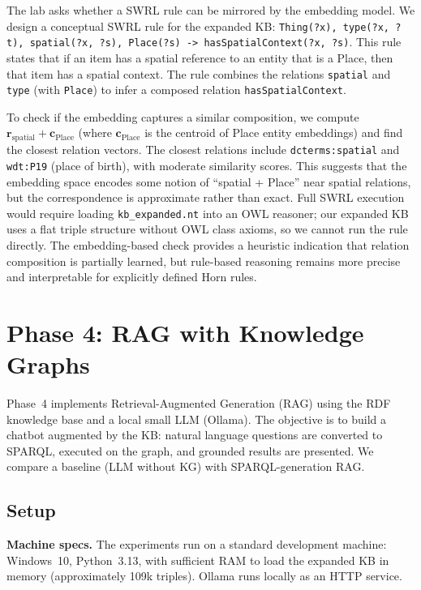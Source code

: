 \documentclass[11pt,a4paper]{article}
\begin{document}
  The lab asks whether a SWRL rule can be mirrored by the embedding model. We design a conceptual SWRL rule for the expanded KB: \texttt{Thing(?x), type(?x, ?t), spatial(?x, ?s), Place(?s) -> hasSpatialContext(?x, ?s)}. This rule states that if an item has a spatial reference to an entity that is a Place, then that item has a spatial context. The rule combines the relations \texttt{spatial} and \texttt{type} (with \texttt{Place}) to infer a composed relation \texttt{hasSpatialContext}.

  To check if the embedding captures a similar composition, we compute $\mathbf{r}_{\mathrm{spatial}} + \mathbf{c}_{\mathrm{Place}}$ (where $\mathbf{c}_{\mathrm{Place}}$ is the centroid of Place entity embeddings) and find the closest relation vectors. The closest relations include \texttt{dcterms:spatial} and \texttt{wdt:P19} (place of birth), with moderate similarity scores. This suggests that the embedding space encodes some notion of ``spatial + Place'' near spatial relations, but the correspondence is approximate rather than exact. Full SWRL execution would require loading \texttt{kb\_expanded.nt} into an OWL reasoner; our expanded KB uses a flat triple structure without OWL class axioms, so we cannot run the rule directly.   The embedding-based check provides a heuristic indication that relation composition is partially learned, but rule-based reasoning remains more precise and interpretable for explicitly defined Horn rules.

  \section{Phase 4: RAG with Knowledge Graphs}

  Phase~4 implements Retrieval-Augmented Generation (RAG) using the RDF knowledge base and a local small LLM (Ollama). The objective is to build a chatbot augmented by the KB: natural language questions are converted to SPARQL, executed on the graph, and grounded results are presented. We compare a baseline (LLM without KG) with SPARQL-generation RAG.

  \subsection{Setup}

  \textbf{Machine specs.} The experiments run on a standard development machine: Windows~10, Python~3.13, with sufficient RAM to load the expanded KB in memory (approximately 109k triples). Ollama runs locally as an HTTP service.
\end{document}
